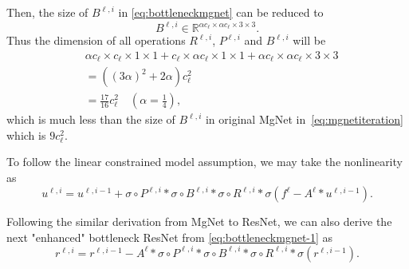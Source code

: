 Then, the size of $B^{\ell,i}$ in \eqref{eq:bottleneckmgnet} can be reduced to
\begin{equation}\label{key}
B^{\ell,i} \in \mathbb{R}^{\alpha c_\ell \times\alpha c_\ell \times 3 \times 3}.
\end{equation}
Thus the dimension of all operations $R^{\ell,i}$, $P^{\ell,i}$ and $B^{\ell,i}$ will be
\begin{equation}\label{key}
\begin{aligned}
&\alpha c_\ell \times c_\ell \times 1 \times 1 +  c_\ell \times \alpha c_\ell \times 1 \times 1 + \alpha c_\ell \times\alpha c_\ell \times 3  \times 3 \\ 
&= ((3\alpha)^2 +  2\alpha) c_\ell^2\\
&= \frac{17}{16} c_\ell^2 \quad ( \alpha = \frac{1}{4}),
\end{aligned}
\end{equation}
which is much less than the size of $B^{\ell,i}$ in original MgNet in~\eqref{eq:mgnetiteration} which
is $9c_\ell^2$.

To follow the linear constrained model assumption, we may take the nonlinearity as
 \begin{equation}\label{eq:bottleneckmgnet-1}
 u^{\ell,i} = u^{\ell,i-1} +   \sigma \circ P^{\ell,i} \ast  \sigma \circ B^{\ell,i} \ast  \sigma \circ R^{\ell,i} \ast \sigma ({f^\ell -  A^{\ell} \ast u^{\ell,i-1}}).
 \end{equation}
 
 Following the similar derivation from MgNet to ResNet, we can also derive
 the next "enhanced" bottleneck ResNet from \eqref{eq:bottleneckmgnet-1} as
 \begin{equation}\label{key}
  r^{\ell,i} = r^{\ell,i-1} -  A^\ell \ast \sigma \circ   P^{\ell,i} \ast  \sigma \circ B^{\ell,i} \ast  \sigma \circ R^{\ell,i} \ast \sigma (r^{\ell,i-1}).
 \end{equation}

